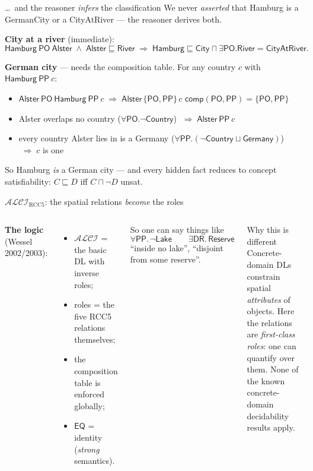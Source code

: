 \documentclass[aspectratio=169,11pt]{beamer}
\newcommand{\ALCIRCC}[1]{\mathcal{ALCI}_{\mathrm{RCC#1}}}
\newcommand{\ALCI}{\ensuremath{\mathcal{ALCI}}}
\newcommand{\DR}{\mathsf{DR}}
\newcommand{\PO}{\mathsf{PO}}
\newcommand{\PP}{\mathsf{PP}}
\newcommand{\EQ}{\mathsf{EQ}}
\newcommand{\comp}{\ensuremath{\mathsf{comp}}}
\begin{document}
\begin{frame}{\dots\ and the reasoner \emph{infers} the classification}
We never \emph{asserted} that Hamburg is a \textsf{GermanCity} or a
\textsf{CityAtRiver} --- the \alert{reasoner derives both}.
\smallskip

\textbf{City at a river} (immediate):
\[
  \textsf{Hamburg}\ \PO\ \textsf{Alster}
  \;\wedge\; \textsf{Alster}\sqsubseteq\textsf{River}
  \;\Longrightarrow\;
  \textsf{Hamburg}\sqsubseteq\textsf{City}\sqcap\exists\PO.\textsf{River}
  = \textsf{CityAtRiver}.
\]

\textbf{German city} --- needs the \alert{composition table}. For any country
$c$ with $\textsf{Hamburg}\ \PP\ c$:
\begin{itemize}\small
  \item $\textsf{Alster}\ \PO\ \textsf{Hamburg}\ \PP\ c
        \;\Rightarrow\; \textsf{Alster}\,\{\PO,\PP\}\,c$
        \hfill $\comp(\PO,\PP)=\{\PO,\PP\}$
  \item Alster overlaps no country ($\forall\PO.\neg\textsf{Country}$)
        $\;\Rightarrow\; \textsf{Alster}\ \PP\ c$
  \item every country Alster lies in is a \textsf{Germany}
        ($\forall\PP.(\neg\textsf{Country}\sqcup\textsf{Germany})$)
        $\;\Rightarrow\; c$ is one
\end{itemize}
So Hamburg \emph{is} a German city --- and every hidden fact reduces to
\alert{concept satisfiability}: $C\sqsubseteq D$ iff $C\sqcap\neg D$ unsat.
\end{frame}

\begin{frame}{$\ALCIRCC{5}$: the spatial relations \emph{become} the roles}
\begin{columns}[T]
  \textbf{The logic} (Wessel 2002/2003):
  \begin{itemize}
    \item $\ALCI$ = the basic DL with inverse roles;
    \item roles = the five RCC5 relations themselves;
    \item the composition table is enforced \alert{globally};
    \item $\EQ$ = identity (\emph{strong} semantics).
  \end{itemize}
  \medskip
  So one can say things like
  \[
    \forall\PP.\,\neg\textsf{Lake} \qquad \exists\DR.\,\textsf{Reserve}
  \]
  ``inside no lake'', ``disjoint from some reserve''.
  \begin{block}{Why this is different}
    Concrete-domain DLs constrain spatial \emph{attributes} of objects.
    Here the relations are \emph{first-class roles}: one can
    \alert{quantify over them}. None of the known concrete-domain
    decidability results apply.
  \end{block}
\end{columns}
\end{frame}
\end{document}
